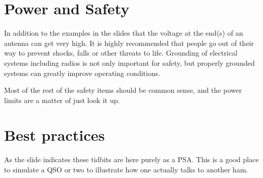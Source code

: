 \documentclass[12pt,letterpaper]{report}
\begin{document}
\section*{Power and Safety}
In addition to the examples in the slides that the voltage at the end(s) of an antenna can get very high. It is highly recommended that people go out of their way to prevent shocks, falls or other threats to life. Grounding of electrical systems including radios is not only important for safety, but properly grounded systems can greatly improve operating conditions.

Most of the rest of the safety items should be common sense, and the power limits are a matter of just look it up.

\section*{Best practices}
As the slide indicates these tidbits are here purely as a PSA. This is a good place to simulate a QSO or two to illustrate how one actually talks to another ham.
\end{document}
